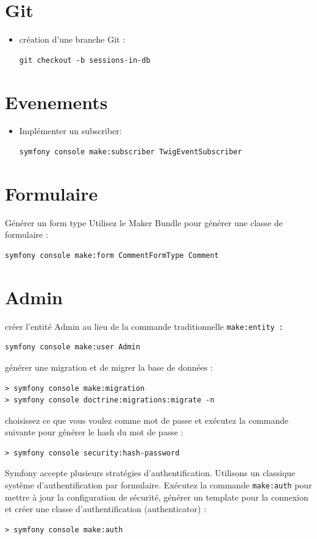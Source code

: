 \documentclass{article}
\begin{document}
\section{Git}
\begin{itemize}
\item création d'une branche Git :
\begin{verbatim}
git checkout -b sessions-in-db
\end{verbatim}
\end{itemize}



\section{Evenements}
\begin{itemize}
\item Implémenter un subscriber:
\begin{verbatim}
symfony console make:subscriber TwigEventSubscriber
\end{verbatim}

\end{itemize}

\section{Formulaire}
Générer un form type
Utilisez le Maker Bundle pour générer une classe de formulaire :
\begin{verbatim}
symfony console make:form CommentFormType Comment
\end{verbatim}


\section{Admin}
créer l’entité Admin au lieu de
la commande traditionnelle {\tt make:entity :}
\begin{verbatim}
symfony console make:user Admin
\end{verbatim}
générer une migration et de migrer la base de données :
\begin{verbatim}
> symfony console make:migration
> symfony console doctrine:migrations:migrate -n
\end{verbatim}
choisissez ce que vous voulez comme
mot de passe et exécutez la commande suivante pour générer le hash du mot de passe :
\begin{verbatim}
> symfony console security:hash-password
\end{verbatim}
Symfony accepte plusieurs stratégies
d’authentification. Utilisons un classique système d’authentification par formulaire. Exécutez la commande {\tt make:auth} pour mettre à jour la configuration de sécurité, générer un template pour la connexion et créer une classe d’authentification (authenticator) :
\begin{verbatim}
> symfony console make:auth
\end{verbatim}
\end{document}

